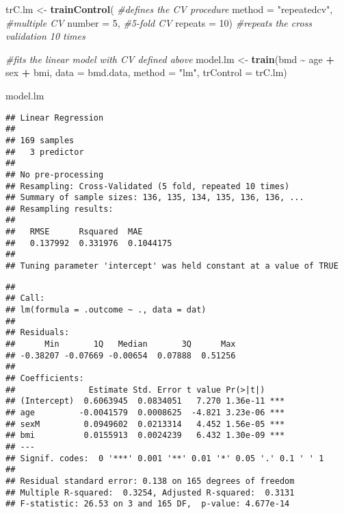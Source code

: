 \documentclass[
]{book}
\newenvironment{Shaded}{\begin{snugshade}}{\end{snugshade}}
\newcommand{\AttributeTok}[1]{\textcolor[rgb]{0.13,0.29,0.53}{#1}}
\newcommand{\CommentTok}[1]{\textcolor[rgb]{0.56,0.35,0.01}{\textit{#1}}}
\newcommand{\DecValTok}[1]{\textcolor[rgb]{0.00,0.00,0.81}{#1}}
\newcommand{\FunctionTok}[1]{\textcolor[rgb]{0.13,0.29,0.53}{\textbf{#1}}}
\newcommand{\NormalTok}[1]{#1}
\newcommand{\OtherTok}[1]{\textcolor[rgb]{0.56,0.35,0.01}{#1}}
\newcommand{\SpecialCharTok}[1]{\textcolor[rgb]{0.81,0.36,0.00}{\textbf{#1}}}
\newcommand{\StringTok}[1]{\textcolor[rgb]{0.31,0.60,0.02}{#1}}
\begin{document}
\begin{Shaded}
\begin{Highlighting}[]
\NormalTok{trC.lm }\OtherTok{\textless{}{-}} \FunctionTok{trainControl}\NormalTok{(                  }\CommentTok{\#defines the CV procedure}
                 \AttributeTok{method =} \StringTok{"repeatedcv"}\NormalTok{,  }\CommentTok{\#multiple CV}
                 \AttributeTok{number =} \DecValTok{5}\NormalTok{,            }\CommentTok{\#5{-}fold CV}
                 \AttributeTok{repeats =} \DecValTok{10}\NormalTok{)          }\CommentTok{\#repeats the cross validation 10 times}

\CommentTok{\#fits the linear model with CV defined above}
\NormalTok{model.lm }\OtherTok{\textless{}{-}} \FunctionTok{train}\NormalTok{(bmd }\SpecialCharTok{\textasciitilde{}}\NormalTok{ age }\SpecialCharTok{+}\NormalTok{ sex }\SpecialCharTok{+}\NormalTok{ bmi, }
                \AttributeTok{data =}\NormalTok{ bmd.data, }
                \AttributeTok{method =} \StringTok{"lm"}\NormalTok{, }
                \AttributeTok{trControl =}\NormalTok{ trC.lm)}

\NormalTok{model.lm}
\end{Highlighting}
\end{Shaded}

\begin{verbatim}
## Linear Regression 
## 
## 169 samples
##   3 predictor
## 
## No pre-processing
## Resampling: Cross-Validated (5 fold, repeated 10 times) 
## Summary of sample sizes: 136, 135, 134, 135, 136, 136, ... 
## Resampling results:
## 
##   RMSE      Rsquared  MAE      
##   0.137992  0.331976  0.1044175
## 
## Tuning parameter 'intercept' was held constant at a value of TRUE
\end{verbatim}

\begin{Shaded}
\end{Shaded}

\begin{verbatim}
## 
## Call:
## lm(formula = .outcome ~ ., data = dat)
## 
## Residuals:
##      Min       1Q   Median       3Q      Max 
## -0.38207 -0.07669 -0.00654  0.07888  0.51256 
## 
## Coefficients:
##               Estimate Std. Error t value Pr(>|t|)    
## (Intercept)  0.6063945  0.0834051   7.270 1.36e-11 ***
## age         -0.0041579  0.0008625  -4.821 3.23e-06 ***
## sexM         0.0949602  0.0213314   4.452 1.56e-05 ***
## bmi          0.0155913  0.0024239   6.432 1.30e-09 ***
## ---
## Signif. codes:  0 '***' 0.001 '**' 0.01 '*' 0.05 '.' 0.1 ' ' 1
## 
## Residual standard error: 0.138 on 165 degrees of freedom
## Multiple R-squared:  0.3254, Adjusted R-squared:  0.3131 
## F-statistic: 26.53 on 3 and 165 DF,  p-value: 4.677e-14
\end{verbatim}
\end{document}
